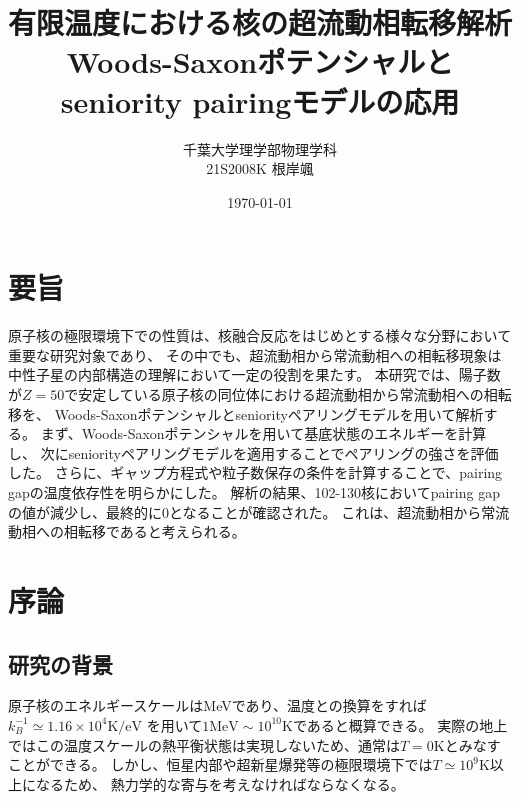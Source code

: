 \documentclass[a4paper]{jsreport}
\title{有限温度における\ce{Sn}核の超流動相転移解析\\Woods-Saxonポテンシャルとseniority pairingモデルの応用}
\author{千葉大学理学部物理学科\\
21S2008K 根岸颯}
\date{\today}
\begin{document}
\maketitle
\chapter*{要旨}
  原子核の極限環境下での性質は、核融合反応をはじめとする様々な分野において重要な研究対象であり、
  その中でも、超流動相から常流動相への相転移現象は中性子星の内部構造の理解において一定の役割を果たす。
  本研究では、陽子数が$Z=50$で安定している原子核の同位体における超流動相から常流動相への相転移を、
  Woods-Saxonポテンシャルとseniorityペアリングモデルを用いて解析する。
  まず、Woods-Saxonポテンシャルを用いて基底状態のエネルギーを計算し、
  次にseniorityペアリングモデルを適用することでペアリングの強さを評価した。
  さらに、ギャップ方程式や粒子数保存の条件を計算することで、pairing gapの温度依存性を明らかにした。 
  解析の結果、102-130核においてpairing gapの値が減少し、最終的に0となることが確認された。
  これは、超流動相から常流動相への相転移であると考えられる。

\tableofcontents

\chapter{序論}
  \section{研究の背景}
  原子核のエネルギースケールはMeVであり、温度との換算をすれば$k_B^{-1}\simeq1.16\times10^4\text{K/eV}$
  を用いて\(1\text{MeV}\sim10^{10}\text{K}\)であると概算できる。
  実際の地上ではこの温度スケールの熱平衡状態は実現しないため、通常は\(T=0\text{K}\)とみなすことができる。
  しかし、恒星内部や超新星爆発等の極限環境下では\(T\simeq10^9\text{K}\)以上になるため、
  熱力学的な寄与を考えなければならなくなる。\par
  
\end{document}
